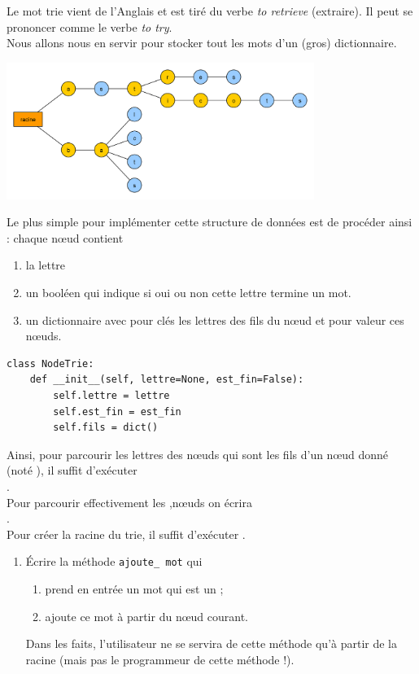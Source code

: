 \documentclass[a4paper,12pt,french]{article}
\begin{document}
\begin{exercice}[ : Trie]
Le mot trie vient de l'Anglais et est tiré du verbe \textit{to retrieve} (extraire). Il peut se prononcer comme le verbe \textit{to try}.\\
Nous allons nous en servir pour stocker tout les mots d'un (gros) dictionnaire.\\
\begin{center}
\includegraphics[width=10cm]{img/trie}
\end{center}
Le plus simple pour implémenter cette structure de données est de procéder ainsi : chaque n\oe ud contient
\begin{enumerate}[--]
	\item 	la lettre
	\item 	un booléen qui indique si oui ou non cette lettre termine un mot.
    \item 	un dictionnaire avec pour clés les lettres des fils du n\oe ud et pour valeur ces n\oe uds.
\end{enumerate}
\begin{verbatim}
class NodeTrie:
    def __init__(self, lettre=None, est_fin=False):
        self.lettre = lettre
        self.est_fin = est_fin
        self.fils = dict()
\end{verbatim}

Ainsi, pour parcourir les lettres des n\oe uds qui sont les fils d'un n\oe ud donné (noté ), il suffit d'exécuter\\ .\\

Pour parcourir effectivement les ,n\oe uds  on écrira\\ .\\

Pour créer la racine du trie, il suffit d'exécuter .
\begin{enumerate}[\bfseries 1.]
	\item 	\'Ecrire la méthode \texttt{ajoute\_ mot} qui
    \begin{enumerate}[--]
    	\item 	prend en entrée un mot qui est un ;
    	\item 	ajoute ce mot à partir du n\oe ud courant.
    \end{enumerate}
    Dans les faits, l'utilisateur ne se  servira de cette méthode qu'à partir de la racine (mais pas le programmeur de cette méthode !).
    

\end{enumerate}
\end{exercice}
\end{document}
